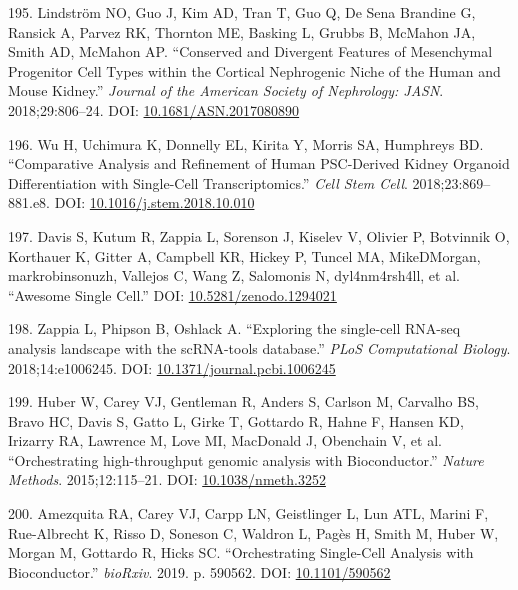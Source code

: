 \documentclass[11pt,a4paper,titlepage,twoside,openright]{style/unimelbthesis}
\theoremstyle{definition}
\theoremstyle{definition}
\theoremstyle{definition}
\theoremstyle{remark}
\begin{document}
\begin{mainmatter}
\leavevmode\hypertarget{ref-Lindstrom2018-mo}{}%
195. Lindström NO, Guo J, Kim AD, Tran T, Guo Q, De Sena Brandine G, Ransick A, Parvez RK, Thornton ME, Basking L, Grubbs B, McMahon JA, Smith AD, McMahon AP. ``Conserved and Divergent Features of Mesenchymal Progenitor Cell Types within the Cortical Nephrogenic Niche of the Human and Mouse Kidney.'' \emph{Journal of the American Society of Nephrology: JASN}. 2018;29:806--24. DOI: \href{https://doi.org/10.1681/ASN.2017080890}{10.1681/ASN.2017080890}

\leavevmode\hypertarget{ref-Wu2018-qi}{}%
196. Wu H, Uchimura K, Donnelly EL, Kirita Y, Morris SA, Humphreys BD. ``Comparative Analysis and Refinement of Human PSC-Derived Kidney Organoid Differentiation with Single-Cell Transcriptomics.'' \emph{Cell Stem Cell}. 2018;23:869--881.e8. DOI: \href{https://doi.org/10.1016/j.stem.2018.10.010}{10.1016/j.stem.2018.10.010}

\leavevmode\hypertarget{ref-Davis_undated-gy}{}%
197. Davis S, Kutum R, Zappia L, Sorenson J, Kiselev V, Olivier P, Botvinnik O, Korthauer K, Gitter A, Campbell KR, Hickey P, Tuncel MA, MikeDMorgan, markrobinsonuzh, Vallejos C, Wang Z, Salomonis N, dyl4nm4rsh4ll, et al. ``Awesome Single Cell.'' DOI: \href{https://doi.org/10.5281/zenodo.1294021}{10.5281/zenodo.1294021}

\leavevmode\hypertarget{ref-Zappia2018-ph}{}%
198. Zappia L, Phipson B, Oshlack A. ``Exploring the single-cell RNA-seq analysis landscape with the scRNA-tools database.'' \emph{PLoS Computational Biology}. 2018;14:e1006245. DOI: \href{https://doi.org/10.1371/journal.pcbi.1006245}{10.1371/journal.pcbi.1006245}

\leavevmode\hypertarget{ref-Huber2015-lz}{}%
199. Huber W, Carey VJ, Gentleman R, Anders S, Carlson M, Carvalho BS, Bravo HC, Davis S, Gatto L, Girke T, Gottardo R, Hahne F, Hansen KD, Irizarry RA, Lawrence M, Love MI, MacDonald J, Obenchain V, et al. ``Orchestrating high-throughput genomic analysis with Bioconductor.'' \emph{Nature Methods}. 2015;12:115--21. DOI: \href{https://doi.org/10.1038/nmeth.3252}{10.1038/nmeth.3252}

\leavevmode\hypertarget{ref-Amezquita2019-id}{}%
200. Amezquita RA, Carey VJ, Carpp LN, Geistlinger L, Lun ATL, Marini F, Rue-Albrecht K, Risso D, Soneson C, Waldron L, Pagès H, Smith M, Huber W, Morgan M, Gottardo R, Hicks SC. ``Orchestrating Single-Cell Analysis with Bioconductor.'' \emph{bioRxiv}. 2019. p. 590562. DOI: \href{https://doi.org/10.1101/590562}{10.1101/590562}


\end{mainmatter}
\end{document}
